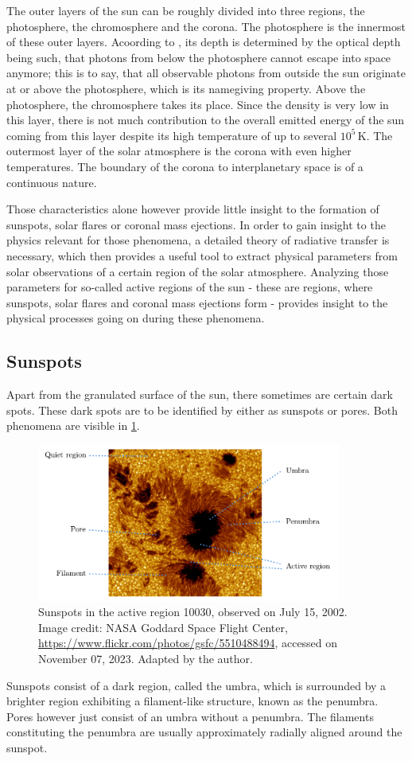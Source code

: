 \documentclass[a4paper,12pt]{report}
\begin{document}
The outer layers of the sun can be roughly divided into three regions, the photosphere, the chromosphere and the corona. The photosphere is the innermost of these outer layers. Acoording to \cite[p.135]{Weigert.2006}, its depth is determined by the optical depth being such, that photons from below the photosphere cannot escape into space anymore; this is to say, that all observable photons from outside the sun originate at or above the photosphere, which is its namegiving property. Above the photosphere, the chromosphere takes its place. Since the density is very low in this layer, there is not much contribution to the overall emitted energy of the sun coming from this layer despite its high temperature of up to several $10^5\,\si{\kelvin}$. The outermost layer of the solar atmosphere is the corona with even higher temperatures. The boundary of the corona to interplanetary space is of a continuous nature.

Those characteristics alone however provide little insight to the formation of sunspots, solar flares or coronal mass ejections. In order to gain insight to the physics relevant for those phenomena, a detailed theory of radiative transfer is necessary, which then provides a useful tool to extract physical parameters from solar observations of a certain region of the solar atmosphere. Analyzing those parameters for so-called active regions of the sun - these are regions, where sunspots, solar flares and coronal mass ejections form - provides insight to the physical processes going on during these phenomena.

\subsection{Sunspots}
Apart from the granulated surface of the sun, there sometimes are certain dark spots. These dark spots are to be identified by either as sunspots or pores. Both phenomena are visible in \cref{fig:sunspots}.
\begin{figure}[h]
\centering
\includegraphics[width=10cm]{figures/sunspots.pdf}
\caption{Sunspots in the active region 10030, observed on July 15, 2002. Image credit: NASA Goddard Space Flight Center, \url{https://www.flickr.com/photos/gsfc/5510488494}, accessed on November 07, 2023. Adapted by the author.}
\label{fig:sunspots}
\end{figure}
Sunspots consist of a dark region, called the umbra, which is surrounded by a brighter region exhibiting a filament-like structure, known as the penumbra. Pores however just consist of an umbra without a penumbra. The filaments constituting the penumbra are usually approximately radially aligned around the sunspot.
\end{document}
